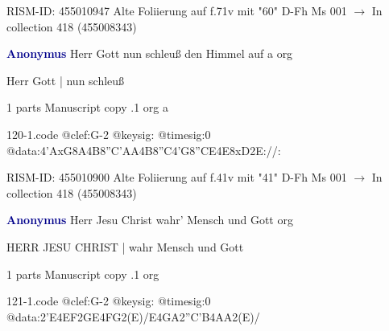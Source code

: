 \documentclass[twocolumn]{book}
\begin{document}
\newline RISM-ID: 455010947
\newline Alte Foliierung auf f.71v mit "60"
\newline D-Fh  Ms 001
\newline $\rightarrow$ In collection 418 (455008343)

\newline \par \vspace{7pt} \textcolor{darkblue}{\textbf{Anonymus  }}
\newline Herr Gott nun schleuß den Himmel auf  a  
\newline org
\newline \begin{itshape}[f.41v, at left:] Herr Gott | nun schleuß\end{itshape} 
\newline \textcolor{darkblue}{}  1 parts  
\newline Manuscript copy
.1  org  a  
\begin{filecontents*}{120-1.code}
@clef:G-2
@keysig:
@timesig:0
@data:4'AxG8A4B8''C{'AA}4B8''C4'G8''CE4E8xD2E://:
\end{filecontents*}
\newline
%

\newline RISM-ID: 455010900
\newline Alte Foliierung auf f.41v mit "41"
\newline D-Fh  Ms 001
\newline $\rightarrow$ In collection 418 (455008343)

\newline \par \vspace{7pt} \textcolor{darkblue}{\textbf{Anonymus  }}
\newline Herr Jesu Christ wahr' Mensch und Gott    
\newline org
\newline \begin{itshape}[f.29v, at left:] HERR JESU CHRIST | wahr Mensch und Gott\end{itshape} 
\newline \textcolor{darkblue}{}  1 parts  
\newline Manuscript copy
.1  org  
\begin{filecontents*}{121-1.code}
@clef:G-2
@keysig:
@timesig:0
@data:2'E4EF2GE4FG2(E)/E4GA2''C'B4AA2(E)/
\end{filecontents*}
\newline
%
\end{document}
